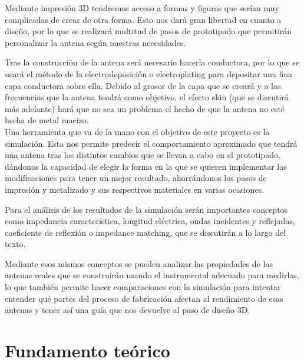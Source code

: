 \documentclass[11pt,a4paper,twoside,pdf]{article}
\numberwithin{equation}{section}
\begin{document}
Mediante impresión 3D tendremos acceso a formas y figuras que serían muy complicadas de crear de otra forma. Esto nos dará gran libertad en cuanto a diseño, por lo que se realizará multitud de pasos de prototipado que permitirán personalizar la antena según nuestras necesidades. 

Tras la construcción de la antena será necesario hacerla conductora, por lo que se usará el método de la electrodeposición o electroplating para depositar una fina capa conductora sobre ella. Debido al grosor de la capa que se creará y a las frecuencias que la antena tendrá como objetivo, el efecto skin (que se discutirá más adelante) hará que no sea un problema el hecho de que la antena no esté hecha de metal macizo. \\

Una herramienta que va de la mano con el objetivo de este proyecto es la simulación. Esta nos permite predecir el comportamiento aproximado que tendrá una antena tras los distintos cambios que se llevan a cabo en el prototipado, dándonos la capacidad de elegir la forma en la que se quieren implementar las modificaciones para tener un mejor resultado, ahorrándonos los pasos de impresión y metalizado y sus respectivos materiales en varias ocasiones.

Para el análisis de los resultados de la simulación serán importantes conceptos como impedancia característica, longitud eléctrica, ondas incidentes y reflejadas, coeficiente de reflexión o impedance matching, que se discutirán a lo largo del texto.

Mediante esos mismos conceptos se pueden analizar las propiedades de las antenas reales que se construirán usando el instrumental adecuado para medirlas, lo que también permite hacer comparaciones con la simulación para intentar entender qué partes del proceso de fabricación afectan al rendimiento de esas antenas y tener así una guía que nos devuelve al paso de diseño 3D.\\


\section{Fundamento teórico}

\end{document}
